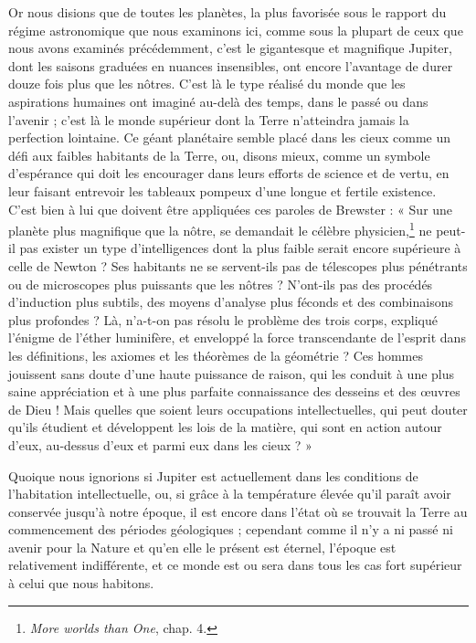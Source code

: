 \documentclass[a4paper, 11pt, oneside, landscape]{article}
\begin{document}
Or nous disions que de toutes les planètes, la plus favorisée sous le rapport du régime astronomique que nous examinons ici, comme sous la plupart de ceux que nous avons examinés précédemment, c'est le gigantesque et magnifique Jupiter, dont les saisons graduées en nuances insensibles, ont encore l'avantage de durer douze fois plus que les nôtres. C'est là le type réalisé du monde que les aspirations humaines ont imaginé au-delà des temps, dans le passé ou dans l'avenir ; c'est là le monde supérieur dont la Terre n'atteindra jamais la perfection lointaine. Ce géant planétaire semble placé dans les cieux comme un défi aux faibles habitants de la Terre, ou, disons mieux, comme un symbole d'espérance qui doit les encourager dans leurs efforts de science et de vertu, en leur faisant entrevoir les tableaux pompeux d'une longue et fertile existence. C'est bien à lui que doivent être appliquées ces paroles de Brewster : « Sur une planète plus magnifique que la nôtre, se demandait le célèbre physicien,\footnote{\emph{More worlds than One}, chap. 4.} ne peut-il pas exister un type d'intelligences dont la plus faible serait encore supérieure à celle de Newton ? Ses habitants ne se servent-ils pas de télescopes plus pénétrants ou de microscopes plus puissants que les nôtres ? N'ont-ils pas des procédés d'induction plus subtils, des moyens d'analyse plus féconds et des combinaisons plus profondes ? Là, n'a-t-on pas résolu le problème des trois corps, expliqué l'énigme de l'éther luminifère, et enveloppé la force transcendante de l'esprit dans les définitions, les axiomes et les théorèmes de la géométrie ? Ces hommes jouissent sans doute d'une haute puissance de raison, qui les conduit à une plus saine appréciation et à une plus parfaite connaissance des desseins et des œuvres de Dieu ! Mais quelles que soient leurs occupations intellectuelles, qui peut douter qu'ils étudient et développent les lois de la matière, qui sont en action autour d'eux, au-dessus d'eux et parmi eux dans les cieux ? »

Quoique nous ignorions si Jupiter est actuellement dans les conditions de l'habitation intellectuelle, ou, si grâce à la température élevée qu'il paraît avoir conservée jusqu'à notre époque, il est encore dans l'état où se trouvait la Terre au commencement des périodes géologiques ; cependant comme il n'y a ni passé ni avenir pour la Nature et qu'en elle le présent est éternel, l'époque est relativement indifférente, et ce monde est ou sera dans tous les cas fort supérieur à celui que nous habitons.
\end{document}
